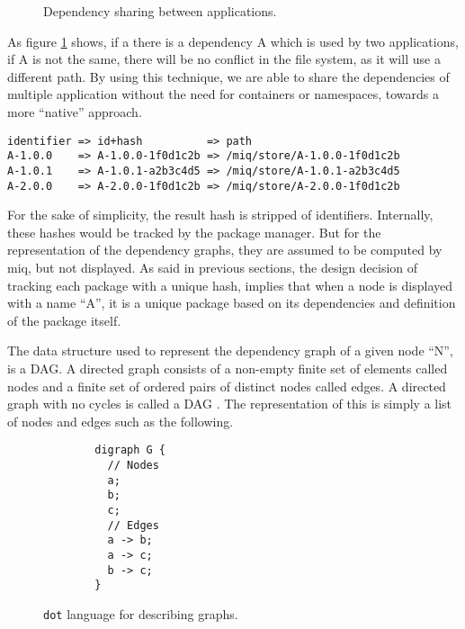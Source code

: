 \begin{figure}[hbtp]
    \centerfloat
    
    \caption{Dependency sharing between applications.}
    \label{fig:dep_share}
\end{figure}

As figure \ref{fig:dep_share} shows, if a there is a
dependency A which is used by two applications, if A is not
the same, there will be no conflict in the file system, as it
will use a different path. By using this technique, we are
able to share the dependencies of multiple application
without the need for containers or namespaces, towards a
more ``native'' approach.

\begin{verbatim}
identifier => id+hash          => path
A-1.0.0    => A-1.0.0-1f0d1c2b => /miq/store/A-1.0.0-1f0d1c2b
A-1.0.1    => A-1.0.1-a2b3c4d5 => /miq/store/A-1.0.1-a2b3c4d5
A-2.0.0    => A-2.0.0-1f0d1c2b => /miq/store/A-2.0.0-1f0d1c2b
\end{verbatim}

For the sake of simplicity, the result hash is stripped of
identifiers. Internally, these hashes would be tracked by
the package manager. But for the representation of the
dependency graphs, they are assumed to be computed by miq,
but not displayed. As said in previous sections, the design
decision of tracking each package with a unique hash,
implies that when a node is displayed with a name ``A'', it
is a unique package based on its dependencies and definition
of the package itself.

The data structure used to represent the dependency graph of
a given node ``N'', is a \acl{DAG}. A directed graph
consists of a non-empty finite set of elements called nodes
and a finite set of ordered pairs of distinct nodes called
edges. A directed graph with no cycles is called a \ac{DAG}
\cite{bang-jensenDigraphs2009} . The representation of this
is simply a list of nodes and edges such as the following.

\begin{figure}[hbtp]
    \centering
    \begin{minipage}[t]{0.5\textwidth}

    \begin{verbatim}
        digraph G {
          // Nodes
          a;
          b;
          c;
          // Edges
          a -> b;
          a -> c;
          b -> c;
        }
    \end{verbatim}
    \end{minipage}
   \caption{\texttt{dot} language for describing graphs.}
   \label{fig:dot_graph}
\end{figure}


